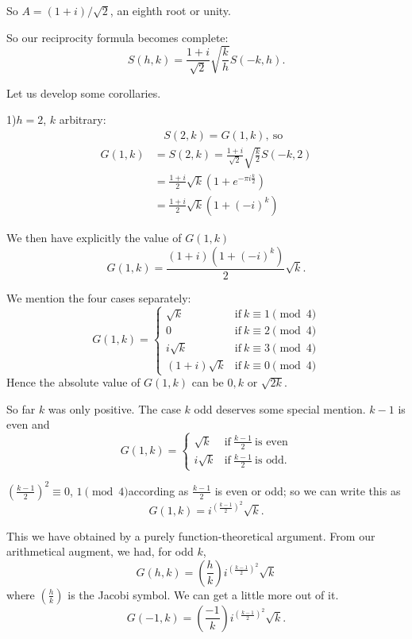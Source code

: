 So $A = (1+i)/ \sqrt{2}$, an eighth root or unity.

So our reciprocity formula becomes complete:
$$
S(h, k)= \frac{1+i}{\sqrt{2}} \sqrt{\frac{k}{h}} S(-k, h).
$$

Let us develop some corollaries.

1)\pageoriginale $h=2$, $k$ arbitrary:
\begin{align*}
  & ~~~~S (2, k)  = G(1, k), ~\text{so}\\
  G(1, k) & = S(2, k) = \frac{1+ i}{\sqrt{2}} \sqrt{\frac{k}{2}} S(-
  k, 2)\\
  & = \frac{1+i}{2} \sqrt{k} (1+ e^{- \pi i \frac{k}{2}})\\
  & = \frac{1+i}{2} \sqrt{k} (1+ (-i)^k)
\end{align*}

We then have explicitly the value of $G(1, k)$
$$
G(1, k)= \frac{(1+i)(1+ (-i)^k)}{2} \sqrt{k}.
$$

We mention the four cases separately:
$$
G(1, k)=
\begin{cases}
  \sqrt{k} & \text{if} ~k \equiv 1 \pmod{4}\\
  0 & \text{if}~ k \equiv 2 \pmod{4}\\
  i\sqrt{k} &\text{if}~ k \equiv 3 \pmod{4}\\
  (1+i)\sqrt{k} & \text{if}~ k \equiv 0 \pmod{4}
\end{cases}
$$
Hence the absolute value of $G(1, k)$ can be $0, k$ or $\sqrt{2k}$.

So far $k$ was only positive. The case $k$ odd deserves some special
mention. $k-1$ is even and 
$$
G(1, k) =
\begin{cases}
  \sqrt{k} & \text{if}~ \frac{k-1}{2} ~\text{is even}\\
  i\sqrt{k} & \text{if}~ \frac{k-1}{2} ~\text{is odd}.
\end{cases}
$$

$\left(\frac{k-1}{2} \right)^2 \equiv 0$,
$1 \pmod{4}$\pageoriginale according as $\frac{k-1}{2}$ is even or odd;
so we can write this as
$$
G(1, k)= i^{\left(\frac{k-1}{2}\right)^2} \sqrt{k}. 
$$

This we have obtained by a purely function-theoretical argument. From
our arithmetical augment, we had, for odd $k$,
$$
G(h, k)= \left( \frac{h}{k}\right) i^{\left( \frac{k-1}{2}\right)^2} \sqrt{k}
$$
where $\left( \frac{h}{k}\right)$ is the Jacobi symbol. We can get a
little more out of it.
$$
G(-1, k)= \left( \frac{-1}{k}\right) i ^{\left(
  \frac{k-1}{2}\right)^2} \sqrt{k}.
$$

